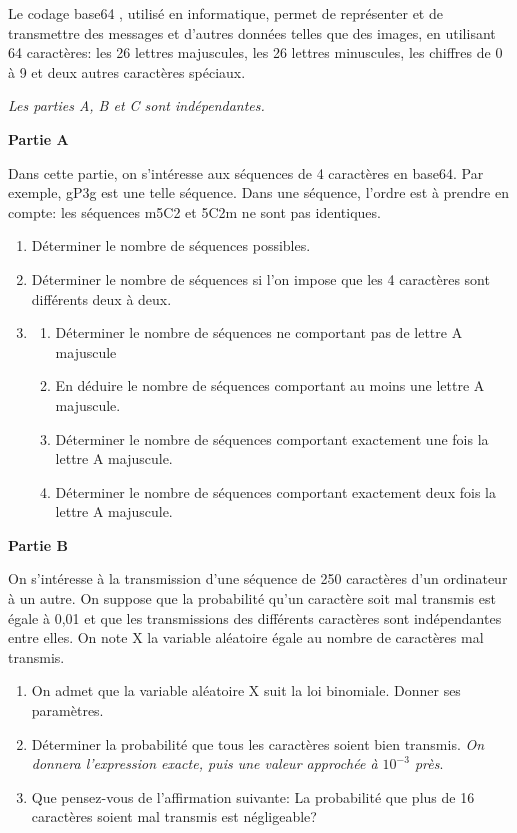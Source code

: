 Le codage \og base64 \fg, utilisé en informatique, permet de représenter et de transmettre des messages et d'autres données telles que des images, en utilisant 64 caractères: les 26 lettres majuscules, les 26 lettres minuscules, les chiffres de 0 à 9 et deux autres caractères spéciaux.

\emph{Les parties {\rm A, B} et {\rm C} sont indépendantes.}

\medskip

\textbf{Partie A}

\medskip

Dans cette partie, on s'intéresse aux séquences de 4 caractères en base64.
Par exemple, \og gP3g \fg est une telle séquence.
Dans une séquence, l'ordre est à prendre en compte: les séquences \og m5C2 \fg et \og 5C2m \fg ne sont pas identiques.

\medskip

\begin{enumerate}
\item Déterminer le nombre de séquences possibles.
\item Déterminer le nombre de séquences si l'on impose que les 4 caractères sont
différents deux à deux.
\item 
	\begin{enumerate}
		\item Déterminer le nombre de séquences ne comportant pas de lettre A majuscule
		\item En déduire le nombre de séquences comportant au moins une lettre A majuscule.
		\item Déterminer le nombre de séquences comportant exactement une fois la lettre A majuscule.
		\item Déterminer le nombre de séquences comportant exactement deux fois la lettre A majuscule.
	\end{enumerate}
\end{enumerate}

\medskip

\textbf{Partie B}

\medskip

On s'intéresse à la transmission d'une séquence de 250 caractères d'un ordinateur à un autre. On suppose que la probabilité qu'un caractère soit mal transmis est égale à 0,01 et que les transmissions des différents caractères sont indépendantes entre elles.
On note X la variable aléatoire égale au nombre de caractères mal transmis.

\medskip

\begin{enumerate}
\item On admet que la variable aléatoire X suit la loi binomiale. Donner ses paramètres.
\item Déterminer la probabilité que tous les caractères soient bien transmis. \emph{On donnera
l'expression exacte, puis une valeur approchée à $10^{-3}$ près}.
\item Que pensez-vous de l'affirmation suivante: \og La probabilité que plus de 16
caractères soient mal transmis est négligeable\fg ?
\end{enumerate}

